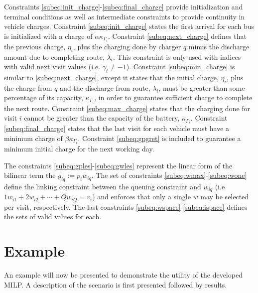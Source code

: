 \documentclass[letterpaper, 10pt, conference]{IEEEtran}
\begin{document}
Constraints \eqref{subeq:init_charge}-\eqref{subeq:final_charge} provide initialization and terminal conditions as well as intermediate constraints to provide continuity in vehicle charges. Constraint \eqref{subeq:init_charge} states the first arrival for each bus is initialized with a charge of $\alpha \kappa_{\Gamma_i}$. Constraint \eqref{subeq:next_charge} defines that the previous charge, $\eta_i$, plus the charging done by charger $q$ minus the discharge amount due to completing route, $\lambda_i$. This constraint is only used with indices with valid next visit values (i.e. $\gamma_i \neq -1$). Constraint \eqref{subeq:min_charge} is similar to \eqref{subeq:next_charge}, except it states that the initial charge, $\eta_i$, plus the charge from $q$ and the discharge from route, $\lambda_i$, must be greater than some percentage of its capacity, $\kappa_{\Gamma_i}$, in order to guarantee sufficient charge to complete the next route. Constraint \eqref{subeq:max_charge} states that the charging done for visit $i$ cannot be greater than the capacity of the battery, $\kappa_{\Gamma_i}$. Constraint \eqref{subeq:final_charge} states that the last visit for each vehicle must have a minimum charge of $\beta \kappa_{\Gamma_i}$. Constraint \eqref{subeq:gpgret} is included to guarantee a minimum initial charge for the next working day.

The constraints \eqref{subeq:gples}-\eqref{subeq:gwles} represent the linear form of the bilinear term the $g_{iq} := p_i w_{iq}$. The set of constraints \eqref{subeq:wmax}-\eqref{subeq:wone} define the linking constraint between the queuing constraint and $w_{iq}$ (i.e $1w_{i1} + 2w_{i2} + \cdots + Qw_{iQ} = v_i$) and enforces that only a single $w$ may be selected per visit, respectively. The last constraints \eqref{subeq:wspace}-\eqref{subeq:ispace} defines the sets of valid values for each.

\section{Example}
\label{sec:example}

An example will now be presented to demonstrate the utility of the developed MILP. A description of the scenario is first presented followed by results.
\end{document}
